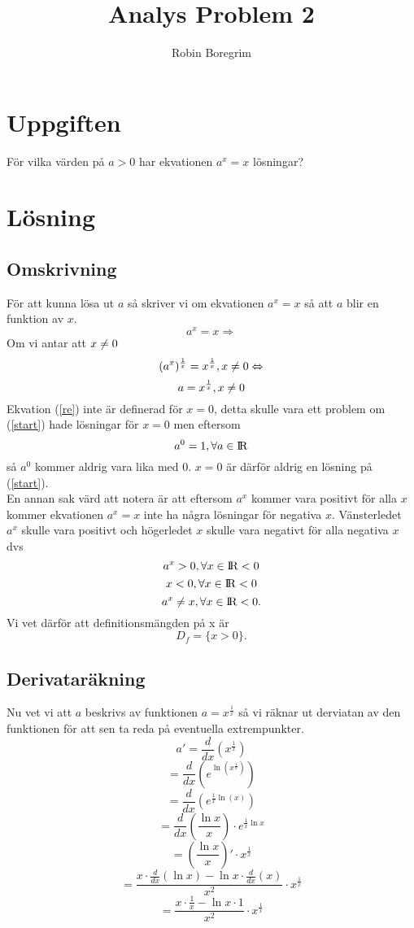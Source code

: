 \documentclass[11pt]{article}
\begin{document}
\title{Analys Problem 2}
\author{Robin Boregrim}
\maketitle
\renewcommand{\contentsname}{Innehållsförteckning}
\tableofcontents
\newpage
\section{Uppgiften}
För vilka värden på $a> 0$ har ekvationen $a^x = x$ lösningar?
\section{Lösning}
\subsection{Omskrivning}
För att kunna lösa ut $a$ så skriver vi om ekvationen $a^x = x$ så att $a$ blir en funktion av $x$.
\begin{equation}\label{start}
a^x = x \Rightarrow
\end{equation}
Om vi antar att $x \centernot = 0$
$$ (a^x)^{\frac{1}{x}} = x^{\frac{1}{x}}, x \centernot= 0 \Leftrightarrow$$ 
\begin{equation}\label{re}
 a = x^{\frac{1}{x}}, x \centernot= 0
\end{equation}
Ekvation (\ref{re}) inte är definerad för $x=0$, detta skulle vara ett problem om (\ref{start}) hade lösningar för $x=0$ men eftersom 
$$a^0 = 1, \forall a\in {\rm I\!R}$$ så $a^0$ kommer aldrig vara lika med $0$. $x = 0$ är därför aldrig en lösning på (\ref{start}).\\
En annan sak värd att notera är att eftersom $a^x$ kommer vara positivt för alla $x$ kommer ekvationen $a^x = x$ inte ha några lösningar för negativa $x$. Vänsterledet $a^x$ skulle vara positivt och högerledet $x$ skulle vara negativt för alla negativa $x$ dvs 
$$a^x > 0, \forall x \in {\rm I\!R} < 0$$
$$x < 0, \forall x \in {\rm I\!R} < 0$$
$$a^x \centernot = x, \forall x \in {\rm I\!R} < 0.$$
Vi vet därför att definitionsmängden på x är
$$D_f = \{ x > 0 \} .$$
\subsection{Derivataräkning}
Nu vet vi att $a$ beskrivs av funktionen $a = x^{\frac{1}{x}}$ så vi räknar ut derviatan av den funktionen för att sen ta reda på eventuella extrempunkter.
$$a' = \frac{d}{dx}(x^{\frac{1}{x}})$$
$$= \frac{d}{dx}(e^{\ln(x^{\frac{1}{x}})})$$
$$= \frac{d}{dx}(e^{\frac{1}{x}\ln(x)})$$
$$=\frac{d}{dx}(\frac{\ln x}{x}) \cdot e^{\frac{1}{x}\ln x}$$
$$=(\frac{\ln x}{x})' \cdot x^{\frac{1}{x}}$$
$$=\frac{x \cdot \frac{d}{dx}(\ln x) - \ln x \cdot \frac{d}{dx} (x)}{x^2} \cdot x^{\frac{1}{x}}$$
$$=\frac{x\cdot \frac{1}{x} - \ln x \cdot 1}{x^2} \cdot x^{\frac{1}{x}}$$
\end{document}
